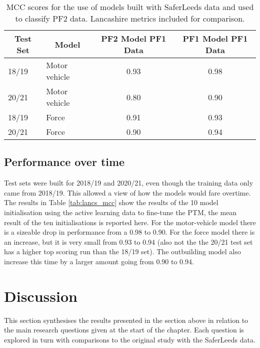 \begin{table}[]
\begin{tabular}{@{}llcc@{}}
\toprule
\multicolumn{1}{c}{Test Set} & \multicolumn{1}{c}{Model} & PF2 Model PF1 Data & PF1 Model PF1 Data \\ \midrule
18/19                        & Motor vehicle             & 0.93                   & 0.98                   \\
20/21                        & Motor vehicle             & 0.80                   & 0.90                   \\
18/19                        & Force                     & 0.91  & 0.93  \\
20/21                        & Force                     & 0.90  & 0.94 \\ \bottomrule
\end{tabular}
\caption[Model metrics. Models tested on alternate police force.]{\label{tab:results_transfer} MCC scores for the use of models built with SaferLeeds data and used to classify PF2 data. Lancashire metrics included for comparison. }
\end{table}

\subsection{Performance over time} Test sets were built for 2018/19 and 2020/21, even though the training data only came from 2018/19. This allowed a view of how the models would fare overtime. The results in Table \ref{tab:lancs_mcc} show the results of the 10 model initialisation using the active learning data to fine-tune the PTM, the mean result of the ten initialisations is reported here. For the motor-vehicle model there is a sizeable drop in performance from a 0.98 to 0.90. For the force model there is an increase, but it is very small from 0.93 to 0.94 (also not the the 20/21 test set has a higher top scoring run than the 18/19 set). The outbuilding model also increase this time by a larger amount going from 0.90 to 0.94.


\section{Discussion} This section synthesises the results presented in the section above in relation to the main research questions given at the start of the chapter. Each question is explored in turn with comparisons to the original study with the SaferLeeds data.

